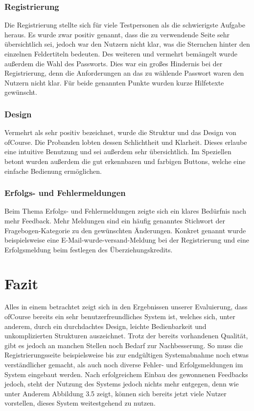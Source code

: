\subsubsection{Registrierung}
Die Registrierung stellte sich für viele Testpersonen als die schwierigste Aufgabe heraus. Es wurde zwar positiv genannt, dass die zu verwendende Seite sehr übersichtlich sei, jedoch war den Nutzern nicht klar, was die Sternchen hinter den einzelnen Feldertiteln bedeuten. Des weiteren und vermehrt bemängelt wurde außerdem die Wahl des Passworts. Dies war ein großes Hindernis bei der Registrierung, denn die Anforderungen an das zu wählende Passwort waren den Nutzern nicht klar. Für beide genannten Punkte wurden kurze Hilfetexte gewünscht.
\subsubsection{Design}
Vermehrt als sehr positiv bezeichnet, wurde die Struktur und das Design von ofCourse. Die Probanden lobten dessen Schlichtheit und Klarheit. Dieses erlaube eine intuitive Benutzung und sei außerdem sehr übersichtlich. Im Speziellen betont wurden außerdem die gut erkennbaren und farbigen Buttons, welche eine einfache Bedienung ermöglichen.
\subsubsection{Erfolgs- und Fehlermeldungen}
Beim Thema Erfolgs- und Fehlermeldungen zeigte sich ein klares Bedürfnis nach mehr Feedback. Mehr Meldungen sind ein häufig genanntes Stichwort der Fragebogen-Kategorie zu den gewünschten Änderungen. Konkret genannt wurde beispielsweise eine E-Mail-wurde-versand-Meldung bei der Registrierung und eine Erfolgsmeldung beim festlegen des Überziehungskredits.

\newpage
\section{Fazit}
Alles in einem betrachtet zeigt sich in den Ergebnissen unserer Evaluierung, dass ofCourse bereits ein sehr benutzerfreundliches System ist, welches sich, unter anderem, durch ein durchdachtes Design, leichte Bedienbarkeit und unkomplizierten Strukturen auszeichnet. Trotz der bereits vorhandenen Qualität, gibt es jedoch an manchen Stellen noch Bedarf zur Nachbesserung. So muss die Registrierungsseite beispielsweise bis zur endgültigen Systemabnahme noch etwas verständlicher gemacht, als auch noch diverse Fehler- und Erfolgsmeldungen im System eingebaut werden. Nach erfolgreichem Einbau des gewonnenen Feedbacks jedoch, steht der Nutzung des Systems jedoch nichts mehr entgegen, denn wie unter Anderem Abbildung 3.5 zeigt, können sich bereits jetzt viele Nutzer vorstellen, dieses System weitestgehend zu nutzen.